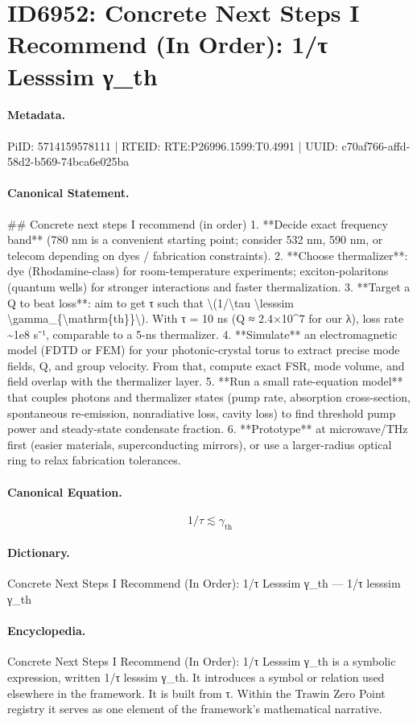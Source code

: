 \section*{ID6952: Concrete Next Steps I Recommend (In Order): 1/τ Lesssim γ\_th}
\paragraph{Metadata.}
PiID: 5714159578111 | RTEID: RTE:P26996.1599:T0.4991 | UUID: c70af766-affd-58d2-b569-74bca6e025ba

\paragraph{Canonical Statement.}
\#\# Concrete next steps I recommend (in order) 1. **Decide exact frequency band** (780 nm is a convenient starting point; consider 532 nm, 590 nm, or telecom depending on dyes / fabrication constraints). 2. **Choose thermalizer**: dye (Rhodamine-class) for room-temperature experiments; exciton-polaritons (quantum wells) for stronger interactions and faster thermalization. 3. **Target a Q to beat loss**: aim to get τ such that \textbackslash{}(1/\textbackslash{}tau \textbackslash{}lesssim \textbackslash{}gamma\_\{\textbackslash{}mathrm\{th\}\}\textbackslash{}). With τ = 10 ns (Q ≈ 2.4×10\textasciicircum{}7 for our λ), loss rate \textasciitilde{}1e8 s⁻¹, comparable to a 5-ns thermalizer. 4. **Simulate** an electromagnetic model (FDTD or FEM) for your photonic-crystal torus to extract precise mode fields, Q, and group velocity. From that, compute exact FSR, mode volume, and field overlap with the thermalizer layer. 5. **Run a small rate-equation model** that couples photons and thermalizer states (pump rate, absorption cross-section, spontaneous re-emission, nonradiative loss, cavity loss) to find threshold pump power and steady-state condensate fraction. 6. **Prototype** at microwave/THz first (easier materials, superconducting mirrors), or use a larger-radius optical ring to relax fabrication tolerances.

\paragraph{Canonical Equation.}
\[
1/\tau \lesssim \gamma_{\mathrm{th}}
\]

\paragraph{Dictionary.}
Concrete Next Steps I Recommend (In Order): 1/τ Lesssim γ\_th — 1/τ lesssim γ\_th

\paragraph{Encyclopedia.}
Concrete Next Steps I Recommend (In Order): 1/τ Lesssim γ\_th is a symbolic expression, written 1/τ lesssim γ\_th. It introduces a symbol or relation used elsewhere in the framework. It is built from τ. Within the Trawin Zero Point registry it serves as one element of the framework's mathematical narrative.
